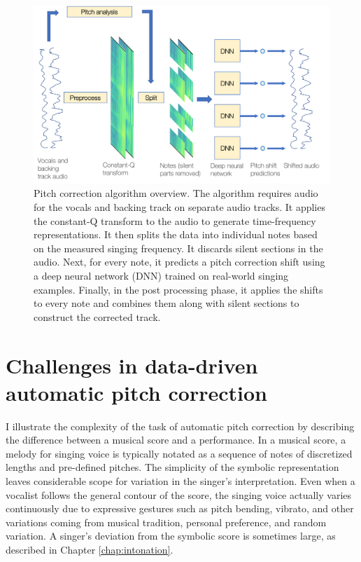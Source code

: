 \begin{figure}[t!]
    \centering
    \includegraphics[width=\columnwidth]{images/program_flow_chart.png}
    \caption{Pitch correction algorithm overview. The algorithm requires audio for the vocals and backing track on separate audio tracks. It applies the constant-Q transform to the audio to generate time-frequency representations. It then splits the data into individual notes based on the measured singing frequency. It discards silent sections in the audio. Next, for every note, it predicts a pitch correction shift using a deep neural network (DNN) trained on real-world singing examples. Finally, in the post processing phase, it applies the shifts to every note and combines them along with silent sections to construct the corrected track. }
    \label{fig:results}
\end{figure}

\section{Challenges in data-driven automatic pitch correction}

I illustrate the complexity of the task of automatic pitch correction by describing the difference between a musical score and a performance. In a musical score, a melody for singing voice is typically notated as a sequence of notes of discretized lengths and pre-defined pitches. The simplicity of the symbolic representation leaves considerable scope for variation in the singer's interpretation. Even when a vocalist follows the general contour of the score, the singing voice actually varies continuously due to expressive gestures such as pitch bending, vibrato, and other variations coming from musical tradition, personal preference, and random variation. A singer's deviation from the symbolic score is sometimes large, as described in Chapter \ref{chap:intonation}.

